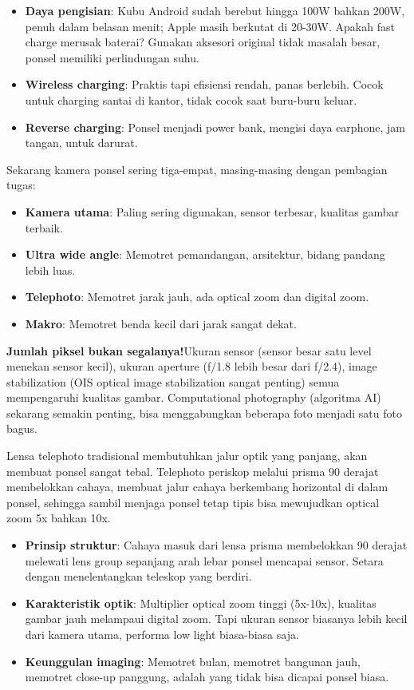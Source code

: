\begin{itemize}
  \item \textbf{Daya pengisian}: Kubu Android sudah berebut hingga 100W bahkan 200W, penuh dalam belasan menit; Apple masih berkutat di 20-30W. Apakah fast charge merusak baterai? Gunakan aksesori original tidak masalah besar, ponsel memiliki perlindungan suhu.
  \item \textbf{Wireless charging}: Praktis tapi efisiensi rendah, panas berlebih. Cocok untuk charging santai di kantor, tidak cocok saat buru-buru keluar.
  \item \textbf{Reverse charging}: Ponsel menjadi power bank, mengisi daya earphone, jam tangan, untuk darurat.
\end{itemize}


Sekarang kamera ponsel sering tiga-empat, masing-masing dengan pembagian tugas:

\begin{itemize}
  \item \textbf{Kamera utama}: Paling sering digunakan, sensor terbesar, kualitas gambar terbaik.
  \item \textbf{Ultra wide angle}: Memotret pemandangan, arsitektur, bidang pandang lebih luas.
  \item \textbf{Telephoto}: Memotret jarak jauh, ada optical zoom dan digital zoom.
  \item \textbf{Makro}: Memotret benda kecil dari jarak sangat dekat.
\end{itemize}

\textbf{Jumlah piksel bukan segalanya!}Ukuran sensor (sensor besar satu level menekan sensor kecil), ukuran aperture (f/1.8 lebih besar dari f/2.4), image stabilization (OIS optical image stabilization sangat penting) semua mempengaruhi kualitas gambar. Computational photography (algoritma AI) sekarang semakin penting, bisa menggabungkan beberapa foto menjadi satu foto bagus.


Lensa telephoto tradisional membutuhkan jalur optik yang panjang, akan membuat ponsel sangat tebal. Telephoto periskop melalui prisma 90 derajat membelokkan cahaya, membuat jalur cahaya berkembang horizontal di dalam ponsel, sehingga sambil menjaga ponsel tetap tipis bisa mewujudkan optical zoom 5x bahkan 10x.

\begin{itemize}
  \item \textbf{Prinsip struktur}: Cahaya masuk dari lensa prisma membelokkan 90 derajat melewati lens group sepanjang arah lebar ponsel mencapai sensor. Setara dengan menelentangkan teleskop yang berdiri.
  \item \textbf{Karakteristik optik}: Multiplier optical zoom tinggi (5x-10x), kualitas gambar jauh melampaui digital zoom. Tapi ukuran sensor biasanya lebih kecil dari kamera utama, performa low light biasa-biasa saja.
  \item \textbf{Keunggulan imaging}: Memotret bulan, memotret bangunan jauh, memotret close-up panggung, adalah yang tidak bisa dicapai ponsel biasa.
\end{itemize}


